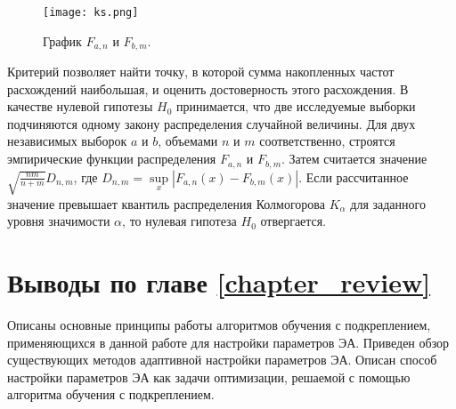\begin{figure}
    \centering
    \texttt{[image: ks.png]}
    \caption{График $F_{a, n}$ и $F_{b, m}$.}
    \label{ks}
\end{figure}

Критерий позволяет найти точку, в которой сумма накопленных частот расхождений наибольшая, и оценить достоверность этого расхождения. В качестве нулевой гипотезы $H_0$ принимается, что две исследуемые выборки подчиняются одному закону распределения случайной величины. Для двух независимых выборок $a$ и $b$, объемами $n$ и $m$ соответственно, строятся эмпирические функции распределения $F_{a, n}$ и $F_{b, m}$. Затем считается значение $\sqrt{\frac{nm}{n + m}}D_{n, m}$, где $D_{n, m} = \sup\limits_x|F_{a, n}(x) - F_{b, m}(x)|$. Если рассчитанное значение превышает квантиль распределения Колмогорова $K_{\alpha}$ для заданного уровня значимости $\alpha$, то нулевая гипотеза $H_0$ отвергается.

\section{Выводы по главе \protect\ref{chapter_review}}

Описаны основные принципы работы алгоритмов обучения с подкреплением, применяющихся в данной работе для настройки параметров ЭА. Приведен обзор существующих методов адаптивной настройки параметров ЭА. Описан способ настройки параметров ЭА как задачи оптимизации, решаемой с помощью алгоритма обучения с подкреплением.
